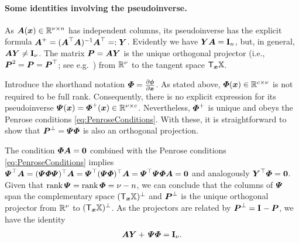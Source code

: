 \paragraph{Some identities involving the pseudoinverse.}
As $\kinMat(\sysCoord) \in \RealNum^{\numCoord\times\dimConfigSpace}$ has independent columns, its pseudoinverse has the explicit formula $\kinMat^+ = (\kinMat^\top \kinMat)^{-1} \kinMat^\top =: \kinBasisMat$.
Evidently we have $\kinBasisMat \kinMat = \idMat[\dimConfigSpace]$, but, in general, $\kinMat \kinBasisMat \neq \idMat[\numCoord]$.
The matrix $\mat{P} = \kinMat \kinBasisMat$ is the unique orthogonal projector (i.e., $\mat{P}^2 = \mat{P} = \mat{P}^\top$; see e.g.\ \cite[p.\ 38]{Horn:MatrixAnalysis}) from $\RealNum^\numCoord$ to the tangent space $\Tangent[\sysCoord]\configSpace$.

Introduce the shorthand notation $\geoConstraintMat = \pdiff[\geoConstraint]{\sysCoord}$.
As stated above, $\geoConstraintMat(\sysCoord) \in \RealNum^{\numGeoConst\times\numCoord}$ is not required to be full rank.
Consequently, there is no explicit expression for its pseudoinverse $\InvGeoConstraintMat(\sysCoord) = \geoConstraintMat^+(\sysCoord) \in \RealNum^{\numCoord\times\numGeoConst}$.
Nevertheless, $\geoConstraintMat^+$ is unique and obeys the Penrose conditions \eqref{eq:PenroseConditions}.
With these, it is straightforward to show that $\mat{P}^\bot = \InvGeoConstraintMat \geoConstraintMat$ is also an orthogonal projection.

The condition $\geoConstraintMat\kinMat = \mat{0}$ combined with the Penrose conditions \eqref{eq:PenroseConditions} implies $\InvGeoConstraintMat^\top \kinMat = (\InvGeoConstraintMat \geoConstraintMat \InvGeoConstraintMat)^\top \kinMat = \InvGeoConstraintMat^\top (\InvGeoConstraintMat \geoConstraintMat)^\top \kinMat = \InvGeoConstraintMat^\top \InvGeoConstraintMat \geoConstraintMat \kinMat = \mat{0}$ and analogously $\kinBasisMat^\top \geoConstraintMat = \mat{0}$.
Given that $\rank\InvGeoConstraintMat = \rank\geoConstraintMat = \numCoord - \dimConfigSpace$, we can conclude that the columns of $\InvGeoConstraintMat$ span the complementary space $(\Tangent[\sysCoord]\configSpace)^\bot$ and $\mat{P}^\bot$ is the unique orthogonal projector from $\RealNum^\numCoord$ to $(\Tangent[\sysCoord]\configSpace)^\bot$.
As the projectors are related by $\mat{P}^\bot = \idMat - \mat{P}$, we have the identity
\begin{align}\label{eq:ProjectionIdentity}
 \kinMat \kinBasisMat +\, \InvGeoConstraintMat \geoConstraintMat = \idMat[\numCoord].
\end{align}

